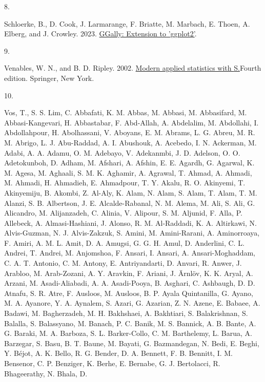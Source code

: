 \documentclass[
  letterpaper,
  DIV=11,
  numbers=noendperiod]{scrartcl}
\newlength{\cslhangindent}
\newlength{\csllabelwidth}
\newenvironment{CSLReferences}[2] %
 {\begin{list}{}{%
  \setlength{\itemindent}{0pt}
  \setlength{\leftmargin}{0pt}
  \setlength{\parsep}{0pt}
  \ifodd #1
   \setlength{\leftmargin}{\cslhangindent}
   \setlength{\itemindent}{-1\cslhangindent}
  \fi
  \setlength{\itemsep}{#2\baselineskip}}}
 {\end{list}}
\newcommand{\CSLLeftMargin}[1]{\parbox[t]{\csllabelwidth}{\strut#1\strut}}
\newcommand{\CSLRightInline}[1]{\parbox[t]{\linewidth - \csllabelwidth}{\strut#1\strut}}
\begin{document}
\begin{CSLReferences}{0}{0}
\CSLLeftMargin{8. }%
\CSLRightInline{Schloerke, B., D. Cook, J. Larmarange, F. Briatte, M.
Marbach, E. Thoen, A. Elberg, and J. Crowley. 2023.
\href{https://CRAN.R-project.org/package=GGally}{GGally: Extension to
'ggplot2'}.}

\CSLLeftMargin{9. }%
\CSLRightInline{Venables, W. N., and B. D. Ripley. 2002.
\href{https://www.stats.ox.ac.uk/pub/MASS4/}{Modern applied statistics
with {S}.}Fourth edition. Springer, New York.}

\CSLLeftMargin{10. }%
\CSLRightInline{Vos, T., S. S. Lim, C. Abbafati, K. M. Abbas, M. Abbasi,
M. Abbasifard, M. Abbasi-Kangevari, H. Abbastabar, F. Abd-Allah, A.
Abdelalim, M. Abdollahi, I. Abdollahpour, H. Abolhassani, V. Aboyans, E.
M. Abrams, L. G. Abreu, M. R. M. Abrigo, L. J. Abu-Raddad, A. I.
Abushouk, A. Acebedo, I. N. Ackerman, M. Adabi, A. A. Adamu, O. M.
Adebayo, V. Adekanmbi, J. D. Adelson, O. O. Adetokunboh, D. Adham, M.
Afshari, A. Afshin, E. E. Agardh, G. Agarwal, K. M. Agesa, M. Aghaali,
S. M. K. Aghamir, A. Agrawal, T. Ahmad, A. Ahmadi, M. Ahmadi, H.
Ahmadieh, E. Ahmadpour, T. Y. Akalu, R. O. Akinyemi, T. Akinyemiju, B.
Akombi, Z. Al-Aly, K. Alam, N. Alam, S. Alam, T. Alam, T. M. Alanzi, S.
B. Albertson, J. E. Alcalde-Rabanal, N. M. Alema, M. Ali, S. Ali, G.
Alicandro, M. Alijanzadeh, C. Alinia, V. Alipour, S. M. Aljunid, F.
Alla, P. Allebeck, A. Almasi-Hashiani, J. Alonso, R. M. Al-Raddadi, K.
A. Altirkawi, N. Alvis-Guzman, N. J. Alvis-Zakzuk, S. Amini, M.
Amini-Rarani, A. Aminorroaya, F. Amiri, A. M. L. Amit, D. A. Amugsi, G.
G. H. Amul, D. Anderlini, C. L. Andrei, T. Andrei, M. Anjomshoa, F.
Ansari, I. Ansari, A. Ansari-Moghaddam, C. A. T. Antonio, C. M. Antony,
E. Antriyandarti, D. Anvari, R. Anwer, J. Arabloo, M. Arab-Zozani, A. Y.
Aravkin, F. Ariani, J. Ärnlöv, K. K. Aryal, A. Arzani, M.
Asadi-Aliabadi, A. A. Asadi-Pooya, B. Asghari, C. Ashbaugh, D. D.
Atnafu, S. R. Atre, F. Ausloos, M. Ausloos, B. P. Ayala Quintanilla, G.
Ayano, M. A. Ayanore, Y. A. Aynalem, S. Azari, G. Azarian, Z. N. Azene,
E. Babaee, A. Badawi, M. Bagherzadeh, M. H. Bakhshaei, A. Bakhtiari, S.
Balakrishnan, S. Balalla, S. Balassyano, M. Banach, P. C. Banik, M. S.
Bannick, A. B. Bante, A. G. Baraki, M. A. Barboza, S. L. Barker-Collo,
C. M. Barthelemy, L. Barua, A. Barzegar, S. Basu, B. T. Baune, M.
Bayati, G. Bazmandegan, N. Bedi, E. Beghi, Y. Béjot, A. K. Bello, R. G.
Bender, D. A. Bennett, F. B. Bennitt, I. M. Bensenor, C. P. Benziger, K.
Berhe, E. Bernabe, G. J. Bertolacci, R. Bhageerathy, N. Bhala, D.
}
\end{CSLReferences}
\end{document}
